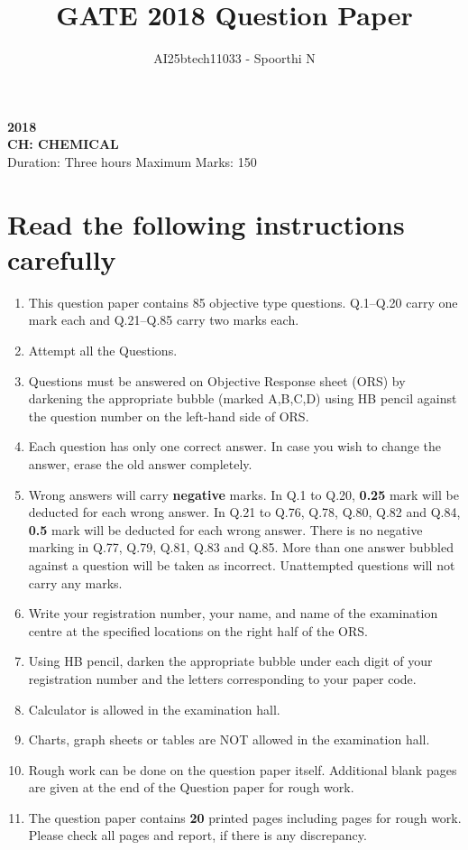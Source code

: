 \documentclass[journal,12pt,onecolumn]{IEEEtran}
\newcommand{\brak}[1]{(#1)}
\begin{document}
\title{GATE 2018 Question Paper}
\author{AI25btech11033 - Spoorthi N}
\maketitle

\begin{center}
\large \textbf{2018}\\[1ex]
\large \textbf{CH: CHEMICAL}\\[2ex]
{Duration: Three hours \hfill Maximum Marks: 150}
\end{center}

\section*{Read the following instructions carefully}
\begin{enumerate}
    \item This question paper contains 85 objective type questions. Q.1--Q.20 carry one mark each and Q.21--Q.85 carry two marks each.
    \item Attempt all the Questions.
    \item Questions must be answered on Objective Response sheet \brak{ORS} by darkening the appropriate bubble \brak{marked A,B,C,D} using HB pencil against the question number on the left-hand side of ORS.
    \item Each question has only one correct answer. In case you wish to change the answer, erase the old answer completely.
    \item Wrong answers will carry \textbf{negative} marks. In Q.1 to Q.20, \textbf{0.25} mark will be deducted for each wrong answer. In Q.21 to Q.76, Q.78, Q.80, Q.82 and Q.84, \textbf{0.5} mark will be deducted for each wrong answer. There is no negative marking in Q.77, Q.79, Q.81, Q.83 and Q.85. More than one answer bubbled against a question will be taken as incorrect. Unattempted questions will not carry any marks.
    \item Write your registration number, your name, and name of the examination centre at the specified locations on the right half of the ORS.
    \item Using HB pencil, darken the appropriate bubble under each digit of your registration number and the letters corresponding to your paper code.
    \item Calculator is allowed in the examination hall.
    \item Charts, graph sheets or tables are NOT allowed in the examination hall.
    \item Rough work can be done on the question paper itself. Additional blank pages are given at the end of the Question paper for rough work.
    \item The question paper contains \textbf{20} printed pages including pages for rough work. Please check all pages and report, if there is any discrepancy.
\end{enumerate}
\end{document}
